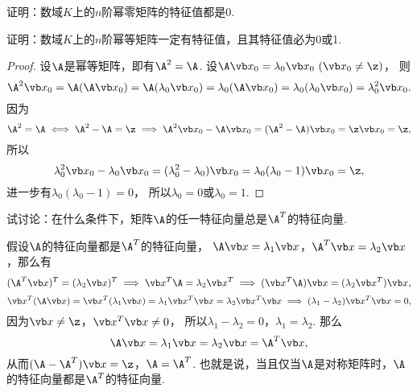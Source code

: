 \begin{example}\label{example:幂零矩阵.幂零矩阵的特征值的性质}
证明：数域\(K\)上的\(n\)阶幂零矩阵的特征值都是\(0\).
\end{example}

\begin{example}\label{example:幂等矩阵.幂等矩阵的特征值的性质}
证明：数域\(K\)上的\(n\)阶幂等矩阵一定有特征值，且其特征值必为0或1.
\begin{proof}
设\(\A\)是幂等矩阵，即有\(\A^2=\A\).
设\(\A\x_0=\lambda_0\x_0\ (\x_0\neq\z)\)，
则\[
	\A^2\x_0
	=\A(\A\x_0)
	=\A(\lambda_0\x_0)
	=\lambda_0(\A\x_0)
	=\lambda_0(\lambda_0\x_0)
	=\lambda_0^2\x_0.
\]
因为\[
	\A^2=\A
	\iff
	\A^2-\A=\z
	\implies
	\A^2\x_0-\A\x_0
	=(\A^2-\A)\x_0
	=\z\x_0
	=\z,
\]
所以\[
	\lambda_0^2\x_0-\lambda_0\x_0
	=(\lambda_0^2-\lambda_0)\x_0
	=\lambda_0(\lambda_0-1)\x_0
	=\z,
\]
进一步有\(\lambda_0(\lambda_0-1)=0\)，
所以\(\lambda_0=0\)或\(\lambda_0=1\).
\end{proof}
\end{example}

\begin{example}
试讨论：在什么条件下，矩阵\(\A\)的任一特征向量总是\(\A^T\)的特征向量.
\begin{solution}
假设\(\A\)的特征向量都是\(\A^T\)的特征向量，
\(\A\x=\lambda_1\x\)，\(\A^T\x=\lambda_2\x\)，那么有\[
	(\A^T\x)^T=(\lambda_2\x)^T
	\implies
	\x^T\A=\lambda_2\x^T
	\implies
	(\x^T\A)\x=(\lambda_2\x^T)\x,
\]\[
	\x^T(\A\x)=\x^T(\lambda_1\x)=\lambda_1\x^T\x=\lambda_2\x^T\x
	\implies
	(\lambda_1-\lambda_2)\x^T\x=0,
\]
因为\(\x\neq\z\)，\(\x^T\x\neq0\)，
所以\(\lambda_1-\lambda_2=0\)，\(\lambda_1=\lambda_2\).
那么\[
	\A\x=\lambda_1\x=\lambda_2\x=\A^T\x,
\]
从而\((\A-\A^T)\x=\z\)，\(\A=\A^T\).
也就是说，当且仅当\(\A\)是对称矩阵时，\(\A\)的特征向量都是\(\A^T\)的特征向量.
\end{solution}
\end{example}

